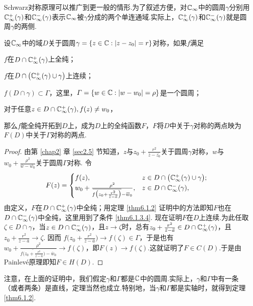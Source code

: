 Schwarz对称原理可以推广到更一般的情形.为了叙述方便，对$\mathbb C_\infty$中的圆周$\gamma$分别用$\mathbb C_\infty^+(\gamma)$和$\mathbb C_\infty^-(\gamma)$表示$\mathbb C_\infty$被$\gamma$分成的两个单连通域.实际上，$\mathbb C_\infty^+(\gamma)$和$\mathbb C_\infty^-(\gamma)$就是圆周$\gamma$的两侧.
\begin{theorem}\label{thm6.1.3}
  设$\mathbb C_\infty$中的域$D$关于圆周$\gamma=\{z\in\mathbb C:|z-z_0|=r\}$对称，如果$f$满足
  \begin{eenum}
    \item \label{thm6.1.3.1}$f$在$D\cap\mathbb C_\infty^+(\gamma)$上全纯；
    \item \label{thm6.1.3.2}$f$在$D\cap\big(\mathbb C_\infty^+(\gamma)\cup\gamma\big)$上连续；
    \item \label{thm6.1.3.3}$f(D\cap\gamma)\subset\Gamma$，这里，$\varGamma=\{w\in\mathbb C:|w-w_0|=\rho\}$是一个圆周；
    \item \label{thm6.1.3.4}对于任意$z\in D\cap\mathbb C_\infty^+(\gamma),f(z)\ne w_0$，
  \end{eenum}
  那么$f$能全纯开拓到$D$上，成为$D$上的全纯函数$F$，$F$将$D$中关于$\gamma$对称的两点映为$F(D)$中关于$\Gamma$对称的两点.
\end{theorem}
\begin{proof}
  由第 \ref{chap2} 章 \ref{sec2.5} 节知道，$z$与$z_0+\frac{r^2}{\bar z-\bar {z_0}}$关于圆周$\gamma$对称，$w$与$w_0+\frac{\rho^2}{\bar w-\bar {w_0}}$关于圆周$\Gamma$对称. 令
  \[
    F(z) = \begin{cases}
    f(z), & z\in D \cap\big(\mathbb C_\infty^+(\gamma)\cup\gamma\big);\\
    w_0 + \frac{\rho^2}{{}\mkern2mu\overline{\mkern-2muf\big(z_0+\frac{r^2}{{}\mkern2mu\overline{\mkern-2muz}-{}\mkern2mu\overline{\mkern-2mua}}\big)}-{}\mkern2mu\overline{\mkern-2muw}_0}, & z\in D\cap
    \mathbb C_\infty^-(\gamma),
  \end{cases}
  \]
  由定义，$F$在$D\cap\mathbb C_\infty^+(\gamma)$中全纯；用定理 \ref{thm6.1.2} 证明中的方法即知$F$也在$D\cap\mathbb C_\infty^-(\gamma)$中全纯，这里用到了条件 \ref{thm6.1.3.4}. 现在证明$F$在$D$上连续.为此任取$\zeta\in D\cap\gamma$，当$z\in D\cap\mathbb C_\infty^-(\gamma)$，且$z\to\zeta$时，总有$z_0+\frac{r^2}{{}\mkern2mu\overline{\mkern-2muz}-{}\mkern2mu\overline{\mkern-2mua}}\in D\cap\mathbb C_\infty^+(\gamma)$，且$z_0+\frac{r^2}{\bar z-\bar a}\to\zeta$. 因而 $f\bigg(z_0+\frac{r^2}{\bar z-\bar a}\bigg)\to f(\zeta)\in\Gamma$，于是也有$  w_0+\frac{\rho^2}{\bar{f\big(z_0+\frac{r^2}{\bar z-\bar a}\big)}-\bar w_0}\to f(\zeta)$，即$F(z)\to f(\zeta)$.这就证明了$F\in C(D)$.于是由Painlev\'e原理即知$F\in H(D)$.
\end{proof}

注意，在上面的证明中，我们假定$\gamma$和$\Gamma$都是$\mathbb C$中的圆周.实际上，$\gamma$和$\Gamma$中有一条（或者两条）是直线，定理当然也成立.特别地，当$\gamma$和$\Gamma$都是实轴时，就得到定理 \ref{thm6.1.2}.

